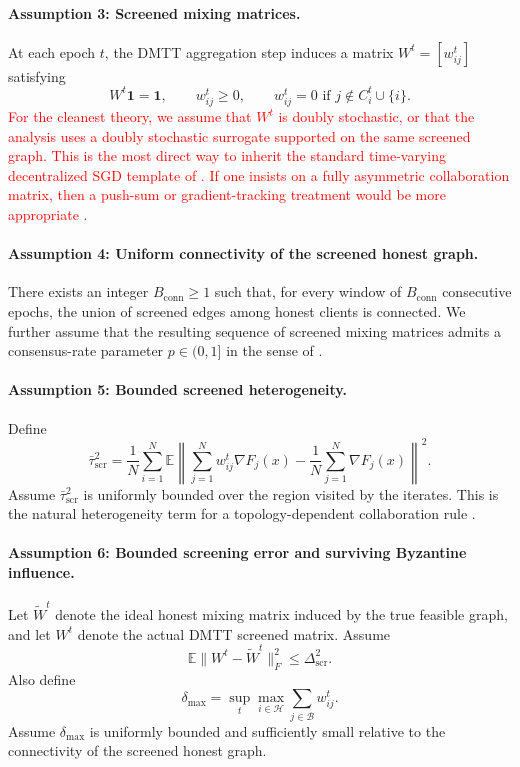 \documentclass[journal]{IEEEtran}
\theoremstyle{definition}
\theoremstyle{remark}
\begin{document}
\paragraph{Assumption 3: Screened mixing matrices.}
At each epoch $t$, the DMTT aggregation step induces a matrix $W^t=[w_{ij}^t]$ satisfying
$$
W^t\mathbf 1 = \mathbf 1,
\qquad
w_{ij}^t \ge 0,
\qquad
w_{ij}^t = 0 \text{ if } j\notin C_i^t\cup\{i\}.
$$
\textcolor{red}{For the cleanest theory, we assume that $W^t$ is doubly stochastic, or that the analysis uses a doubly stochastic surrogate supported on the same screened graph. This is the most direct way to inherit the standard time-varying decentralized SGD template of \cite{koloskova2020unified}. If one insists on a fully asymmetric collaboration matrix, then a push-sum or gradient-tracking treatment would be more appropriate \cite{nedic2014distributed, 7405263}.}

\paragraph{Assumption 4: Uniform connectivity of the screened honest graph.}
There exists an integer $B_{\mathrm{conn}}\ge 1$ such that, for every window of $B_{\mathrm{conn}}$ consecutive epochs, the union of screened edges among honest clients is connected. We further assume that the resulting sequence of screened mixing matrices admits a consensus-rate parameter $p\in(0,1]$ in the sense of \cite{koloskova2020unified}.

\paragraph{Assumption 5: Bounded screened heterogeneity.}
Define
$$
\bar\tau_{\mathrm{scr}}^2
=
\frac{1}{N}
\sum_{i=1}^N
\mathbb E
\left\|
\sum_{j=1}^N w_{ij}^t \nabla F_j(x)
-
\frac{1}{N}\sum_{j=1}^N \nabla F_j(x)
\right\|^2.
$$
Assume $\bar\tau_{\mathrm{scr}}^2$ is uniformly bounded over the region visited by the iterates. This is the natural heterogeneity term for a topology-dependent collaboration rule \cite{le2023refined}.

\paragraph{Assumption 6: Bounded screening error and surviving Byzantine influence.}
Let $\widetilde W^t$ denote the ideal honest mixing matrix induced by the true feasible graph, and let $W^t$ denote the actual DMTT screened matrix. Assume
$$
\mathbb E\|W^t-\widetilde W^t\|_F^2 \le \Delta_{\mathrm{scr}}^2.
$$
Also define
$$
\delta_{\max}
=
\sup_t \max_{i\in\mathcal H}\sum_{j\in\mathcal B} w_{ij}^t.
$$
Assume $\delta_{\max}$ is uniformly bounded and sufficiently small relative to the connectivity of the screened honest graph.
\end{document}
